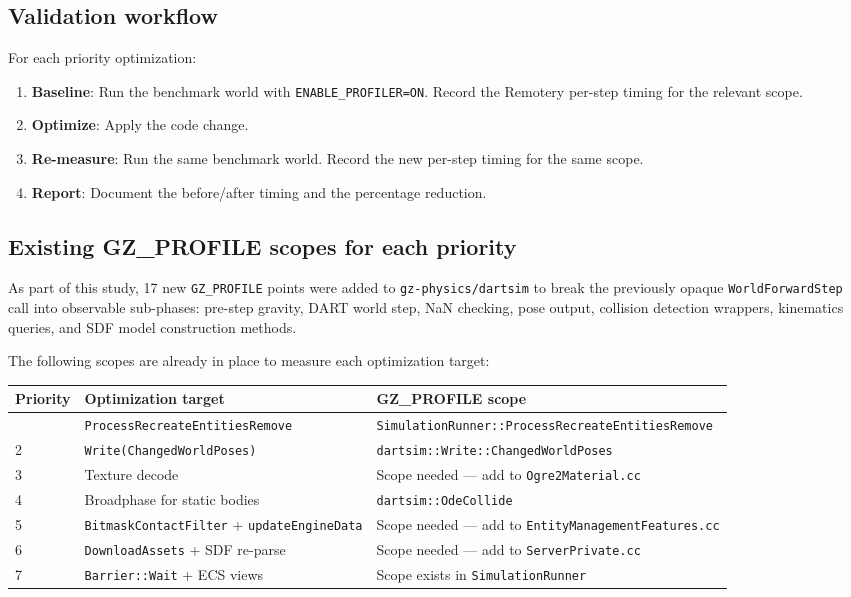 \documentclass[11pt, a4paper]{article}
\begin{document}
\subsection{Validation workflow}

For each priority optimization:

\begin{enumerate}
\item \textbf{Baseline}: Run the benchmark world with \texttt{ENABLE\_PROFILER=ON}. Record the Remotery per-step timing for the relevant scope.
\item \textbf{Optimize}: Apply the code change.
\item \textbf{Re-measure}: Run the same benchmark world. Record the new per-step timing for the same scope.
\item \textbf{Report}: Document the before/after timing and the percentage reduction.
\end{enumerate}

\subsection{Existing GZ\_PROFILE scopes for each priority}

As part of this study, 17 new \texttt{GZ\_PROFILE} points were added to \texttt{gz-physics/dartsim} to break the previously opaque \texttt{WorldForwardStep} call into observable sub-phases: pre-step gravity, DART world step, NaN checking, pose output, collision detection wrappers, kinematics queries, and SDF model construction methods.

The following scopes are already in place to measure each optimization target:

{\footnotesize
\begin{longtable}[]{@{}lll@{}}
\toprule
Priority & Optimization target & GZ\_PROFILE scope \\
\midrule
\endhead
\bottomrule
\endlastfoot
1 & \texttt{ProcessRecreateEntitiesRemove} & \texttt{SimulationRunner::ProcessRecreateEntitiesRemove} \\
2 & \texttt{Write(ChangedWorldPoses)} & \texttt{dartsim::Write::ChangedWorldPoses} \\
3 & Texture decode & Scope needed --- add to \texttt{Ogre2Material.cc} \\
4 & Broadphase for static bodies & \texttt{dartsim::OdeCollide} \\
5 & \texttt{BitmaskContactFilter} + \texttt{updateEngineData} & Scope needed --- add to \texttt{EntityManagementFeatures.cc} \\
6 & \texttt{DownloadAssets} + SDF re-parse & Scope needed --- add to \texttt{ServerPrivate.cc} \\
7 & \texttt{Barrier::Wait} + ECS views & Scope exists in \texttt{SimulationRunner} \\
\end{longtable}
}
\end{document}
